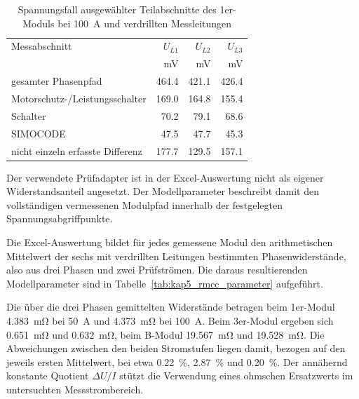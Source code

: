 \begin{table}[H]
    \centering
    \caption{Spannungsfall ausgewählter Teilabschnitte des 1er-Moduls bei
    \SI{100}{\ampere} und verdrillten Messleitungen}
    \label{tab:kap5_rmcc_teilspannungen}
    \begin{tabular}{@{}lrrr@{}}
        \toprule
        Messabschnitt & \(U_{L1}\) & \(U_{L2}\) & \(U_{L3}\) \\
        & \si{\milli\volt} & \si{\milli\volt} & \si{\milli\volt} \\
        \midrule
        gesamter Phasenpfad & \num{464.4} & \num{421.1} & \num{426.4} \\
        Motorschutz-/Leistungsschalter &
        \num{169.0} & \num{164.8} & \num{155.4} \\
        Schalter & \num{70.2} & \num{79.1} & \num{68.6} \\
        SIMOCODE &
        \num{47.5} & \num{47.7} & \num{45.3} \\
        nicht einzeln erfasste Differenz &
        \num{177.7} & \num{129.5} & \num{157.1} \\
        \bottomrule
    \end{tabular}
\end{table}

Der verwendete Prüfadapter ist in der Excel-Auswertung nicht als eigener
Widerstandsanteil angesetzt. Der Modellparameter beschreibt damit den
vollständigen vermessenen Modulpfad innerhalb der festgelegten
Spannungsabgriffpunkte.

Die Excel-Auswertung bildet für jedes gemessene Modul den arithmetischen
Mittelwert der sechs mit verdrillten Leitungen bestimmten Phasenwiderstände,
also aus drei Phasen und zwei Prüfströmen. Die daraus resultierenden
Modellparameter sind in Tabelle~\ref{tab:kap5_rmcc_parameter} aufgeführt.

Die über die drei Phasen gemittelten Widerstände betragen beim 1er-Modul
\SI{4.383}{\milli\ohm} bei \SI{50}{\ampere} und
\SI{4.373}{\milli\ohm} bei \SI{100}{\ampere}. Beim 3er-Modul ergeben sich
\SI{0.651}{\milli\ohm} und \SI{0.632}{\milli\ohm}, beim B-Modul
\SI{19.567}{\milli\ohm} und \SI{19.528}{\milli\ohm}. Die Abweichungen
zwischen den beiden Stromstufen liegen damit, bezogen auf den jeweils ersten
Mittelwert, bei etwa \SI{0.22}{\percent}, \SI{2.87}{\percent} und
\SI{0.20}{\percent}. Der annähernd konstante Quotient \(\Delta U/I\)
stützt die Verwendung eines ohmschen Ersatzwerts im untersuchten
Messstrombereich.

